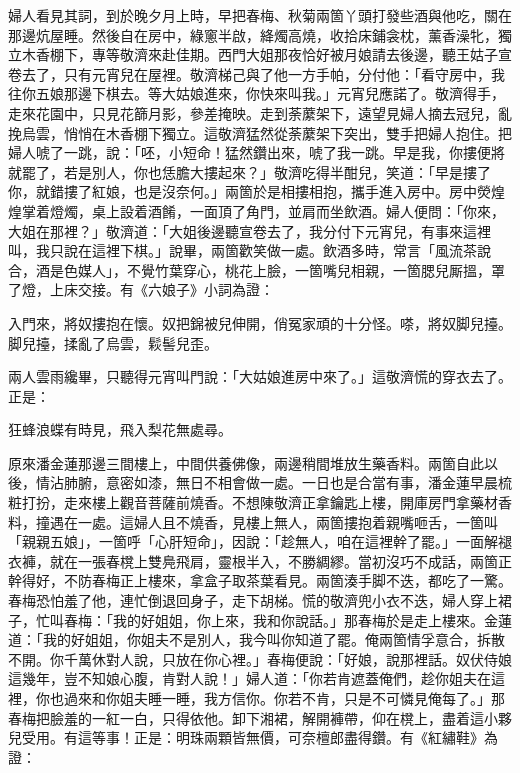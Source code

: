 婦人看見其詞，到於晚夕月上時，早把春梅、秋菊兩箇丫頭打發些酒與他吃，關在那邊炕屋睡。然後自在房中，綠窻半啟，絳燭高燒，收拾床鋪衾枕，薰香澡牝，獨立木香棚下，專等敬濟來赴佳期。西門大姐那夜恰好被月娘請去後邊，聽王姑子宣卷去了，只有元宵兒在屋裡。敬濟梯己與了他一方手帕，分付他：「看守房中，我往你五娘那邊下棋去。等大姑娘進來，你快來叫我。」元宵兒應諾了。敬濟得手，走來花園中，只見花篩月影，參差掩映。走到荼䕷架下，遠望見婦人摘去冠兒，亂挽烏雲，悄悄在木香棚下獨立。這敬濟猛然從荼䕷架下突出，雙手把婦人抱住。把婦人唬了一跳，說：「呸，小短命！猛然鑽出來，唬了我一跳。早是我，你摟便將就罷了，若是別人，你也恁膽大摟起來？」敬濟吃得半酣兒，笑道：「早是摟了你，就錯摟了紅娘，也是沒奈何。」{}兩箇於是相摟相抱，攜手進入房中。房中熒煌煌掌着燈燭，桌上設着酒餚，一面頂了角門，並肩而坐飲酒。婦人便問：「你來，大姐在那裡？」敬濟道：「大姐後邊聽宣卷去了，我分付下元宵兒，有事來這裡叫，我只說在這裡下棋。」說畢，兩箇歡笑做一處。飲酒多時，常言「風流茶說合，酒是色媒人」，不覺竹葉穿心，桃花上臉，一箇嘴兒相親，一箇腮兒厮搵，罩了燈，上床交接。有《六娘子》小詞為證：

\begin{myquote}
入門來，將奴摟抱在懷。奴把錦被兒伸開，俏冤家頑的十分怪。嗏，將奴脚兒擡。脚兒擡，揉亂了烏雲，鬏髻兒歪。
\end{myquote}

兩人雲雨纔畢，只聽得元宵叫門說：「大姑娘進房中來了。」這敬濟慌的穿衣去了。正是：

\begin{myquote}
狂蜂浪蝶有時見，飛入梨花無處尋。
\end{myquote}

原來潘金蓮那邊三間樓上，中間供養佛像，兩邊稍間堆放生藥香料。兩箇自此以後，情沾肺腑，意密如漆，無日不相會做一處。一日也是合當有事，潘金蓮早晨梳粧打扮，走來樓上觀音菩薩前燒香。不想陳敬濟正拿鑰匙上樓，開庫房門拿藥材香料，撞遇在一處。這婦人且不燒香，{}見樓上無人，兩箇摟抱着親嘴咂舌，一箇叫「親親五娘」，一箇呼「心肝短命」，{}因說：「趁無人，咱在這裡幹了罷。」一面解褪衣褲，就在一張春櫈上雙鳧飛肩，靈根半入，不勝綢繆。當初沒巧不成話，兩箇正幹得好，不防春梅正上樓來，拿盒子取茶葉看見。兩箇湊手脚不迭，都吃了一驚。春梅恐怕羞了他，連忙倒退回身子，走下胡梯。慌的敬濟兜小衣不迭，婦人穿上裙子，忙叫春梅：「我的好姐姐，你上來，我和你說話。」那春梅於是走上樓來。金蓮道：「我的好姐姐，你姐夫不是別人，我今叫你知道了罷。俺兩箇情孚意合，拆散不開。你千萬休對人說，只放在你心裡。」春梅便說：「好娘，說那裡話。奴伏侍娘這幾年，豈不知娘心腹，肯對人說！」婦人道：「你若肯遮蓋俺們，趁你姐夫在這裡，你也過來和你姐夫睡一睡，我方信你。你若不肯，只是不可憐見俺每了。」那春梅把臉羞的一紅一白，只得依他。卸下湘裙，解開褲帶，仰在櫈上，盡着這小夥兒受用。{}有這等事！正是：明珠兩顆皆無價，可奈檀郎盡得鑽。有《紅繡鞋》為證：

